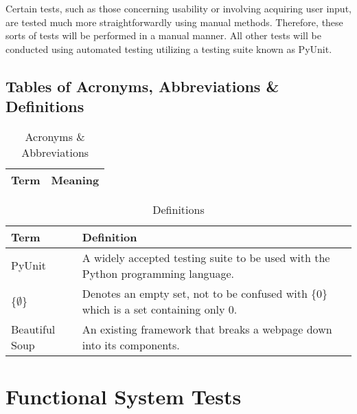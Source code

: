 \documentclass[12pt, titlepage]{article}
\begin{document}
Certain tests, such as those concerning usability or involving acquiring user input, are tested much more straightforwardly using manual methods. Therefore, these sorts of tests will be performed in a manual manner. All other tests will be conducted using automated testing utilizing a testing suite known as PyUnit.

\subsection{Tables of Acronyms, Abbreviations \& Definitions}

\begin{table}[h!]
\centering
\begin{tabular}{| p{3cm} | p{10cm} |}    \hline
	Term &Meaning\\ \hline
\end{tabular}
\caption{Acronyms \& Abbreviations}
\label{table:Acronyms and Abbreviations}
\end{table}

\begin{table}[h!]
\centering
\begin{tabular}{| p{3cm} | p{10cm} |}    \hline
	Term &Definition\\ \hline
	PyUnit &A widely accepted testing suite to be used with the Python programming language.\\ \hline
	\{$\emptyset$\} &Denotes an empty set, not to be confused with \{0\} which is a set containing only 0.\\ \hline
	Beautiful Soup &An existing framework that breaks a webpage down into its components.\\ \hline
\end{tabular}
\caption{Definitions}
\label{table:Definitions}
\end{table}



\section{Functional System Tests}
\end{document}
